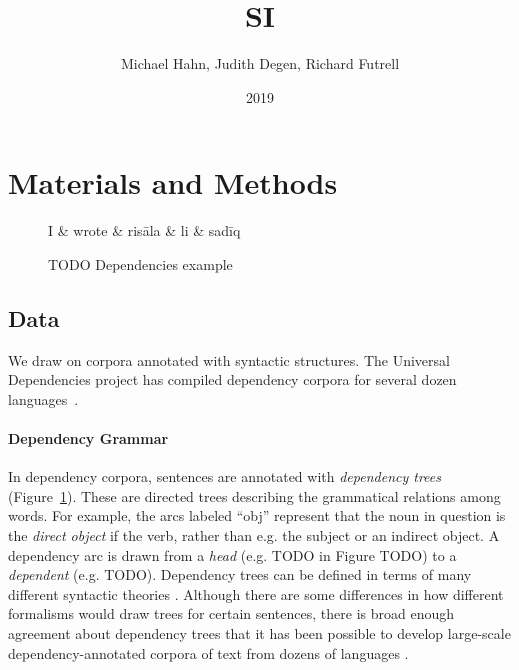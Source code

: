 \documentclass[11pt,letterpaper]{article}
\title{SI}
\author{Michael Hahn, Judith Degen, Richard Futrell}
\date{2019}
\begin{document}
\maketitle

\section{Materials and Methods}


\begin{figure}
\centering
\begin{dependency}[theme = simple]
   \begin{deptext}[column sep=1em]
	   I \&	   wrote \& risāla \& li \& sadīq  \\
   \end{deptext}
\end{dependency}
	\caption{TODO Dependencies example}\label{fig:dependency}
\end{figure}



\subsection{Data}
We draw on corpora annotated with syntactic structures.
The Universal Dependencies project has compiled dependency corpora for several dozen languages~\citep{nivre-universal-2017}.

\paragraph{Dependency Grammar}
In dependency corpora, sentences are annotated with \emph{dependency trees} (Figure~\ref{fig:dependency}).
These are directed trees describing the grammatical relations among words. For example, the arcs labeled ``obj'' represent that the noun in question is the \emph{direct object} if the verb, rather than e.g. the subject or an indirect object.
A dependency arc is drawn from a \emph{head} (e.g. TODO in Figure TODO) to a \emph{dependent} (e.g. TODO).
Dependency trees can be defined in terms of many different syntactic theories \cite{corbett1993heads}.
Although there are some differences in how different formalisms would draw trees for certain sentences, there is broad enough agreement about dependency trees that it has been possible to develop large-scale dependency-annotated corpora of text from dozens of languages \cite{nivre2017universal}.
\end{document}
